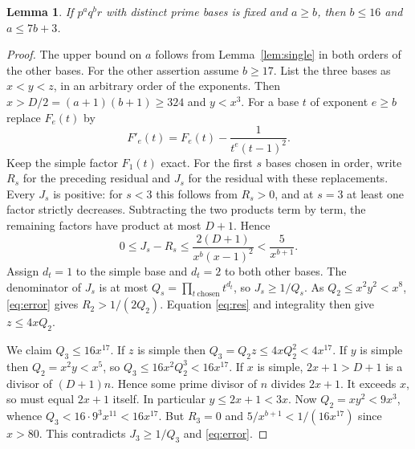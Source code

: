 \documentclass[11pt]{article}
\newtheorem{lemma}[theorem]{Lemma}
\begin{document}
\begin{lemma}\label{lem:both}
If $p^a q^b r$ with distinct prime bases is fixed and $a\ge b$, then
$b\le16$ and $a\le7b+3$.
\end{lemma}
\begin{proof}
The upper bound on $a$ follows from Lemma~\ref{lem:single} in both
orders of the other bases. For the other assertion assume $b\ge17$.
List the three bases as $x<y<z$, in an arbitrary order of the exponents.
Then $x>D/2=(a+1)(b+1)\ge324$ and $y<x^3$.
For a base $t$ of exponent $e\ge b$ replace $F_e(t)$ by
\[
 F'_e(t)=F_e(t)-\frac1{t^e(t-1)^2}.
\]
Keep the simple factor $F_1(t)$ exact. For the first $s$ bases chosen in
order, write $R_s$ for the preceding residual and $J_s$ for the residual
with these replacements. Every $J_s$ is positive: for $s<3$ this
follows from $R_s>0$, and at $s=3$ at least one factor strictly decreases.
Subtracting the two products term by term, the remaining factors have
product at most $D+1$. Hence
\begin{equation}
 0\le J_s-R_s \le \frac{2(D+1)}{x^b(x-1)^2}
 <\frac5{x^{b+1}}.\label{eq:error}
\end{equation}
Assign $d_t=1$ to the simple base and $d_t=2$ to both other bases.
The denominator of $J_s$ is at most $Q_s=\prod_{t\ \mathrm{chosen}}t^{d_t}$,
so $J_s\ge1/Q_s$. As $Q_2\le x^2 y^2<x^8$, \eqref{eq:error} gives
$R_2>1/(2Q_2)$. Equation \eqref{eq:res} and integrality then give
$z\le4xQ_2$.

We claim $Q_3\le16 x^{17}$. If $z$ is simple then
$Q_3=Q_2 z\le4xQ_2^2<4x^{17}$. If $y$ is simple then $Q_2=x^2y<x^5$,
so $Q_3\le16x^2Q_2^3<16x^{17}$.
If $x$ is simple, $2x+1>D+1$ is a divisor of $(D+1)n$. Hence some
prime divisor of $n$ divides $2x+1$. It exceeds $x$, so must equal
$2x+1$ itself. In particular $y\le2x+1<3x$.
Now $Q_2=xy^2<9x^3$, whence $Q_3<16\cdot9^3x^{11}<16x^{17}$.
But $R_3=0$ and $5/x^{b+1}<1/(16x^{17})$ since $x>80$.
This contradicts $J_3\ge1/Q_3$ and \eqref{eq:error}.
\end{proof}
\end{document}
